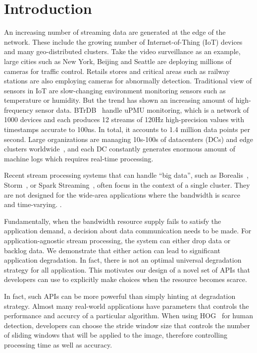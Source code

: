 \section{Introduction}
\label{sec:introduction}

An increasing number of streaming data are generated at the edge of the
network. These include the growing number of Internet-of-Thing (IoT) devices and
many geo-distributed clusters. Take the video surveillance as an example, large
cities such as New York, Beijing and Seattle are deploying millions of cameras
for traffic control. Retails stores and critical areas such as railway stations
are also employing cameras for abnormally detection. Traditional view of sensors
in IoT are slow-changing environment monitoring sensors such as temperature or
humidity. But the trend has shown an increasing amount of high-frequency sensor
data. BTrDB~\cite{andersen2016btrdb} handle uPMU monitoring, which is a network
of 1000 devices and each produces 12 streams of 120Hz high-precision values with
timestamps accurate to 100ns. In total, it accounts to 1.4 million data points
per second. Large organizations are managing 10s-100s of datacenters (DCs) and
edge clusters worldwide~\cite{calder2013mapping}, and each DC constantly
generates enormous amount of machine logs which requires real-time processing.

Recent stream processing systems that can handle ``big data'', such as
Borealis~\cite{abadi2005design}, Storm~\cite{toshniwal2014storm}, or Spark
Streaming~\cite{zaharia2012discretized}, often focus in the context of a single
cluster. They are not designed for the wide-area applications where the
bandwidth is scarce and time-varying. .

Fundamentally, when the bandwidth resource supply fails to satisfy the
application demand, a decision about data communication needs to be made. For
application-agnostic stream processing, the system can either drop data or
backlog data.
We demonstrate that either action can lead to significant application
degradation. In fact, there is not an optimal universal degradation strategy for
all application. This motivates our design of a novel set of APIs that
developers can use to explicitly make choices when the resource becomes scarce.

In fact, such APIs can be more powerful than simply hinting at degradation
strategy. Almost many real-world applications have parameters that controls the
performance and accurcy of a particular algorithm. When using
HOG~\cite{dalal2005histograms} for human detection, developers can choose the
stride window size that controls the number of sliding windows that will be
applied to the image, therefore controlling processing time as well as accuracy.

